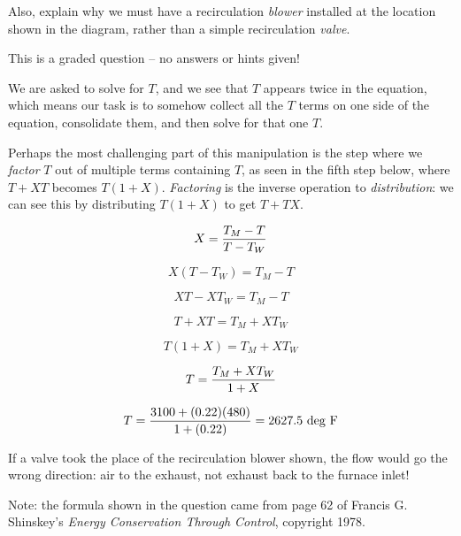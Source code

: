 \vskip 10pt

Also, explain why we must have a recirculation {\it blower} installed at the location shown in the diagram, rather than a simple recirculation {\it valve}.

\vfil 

\eject






This is a graded question -- no answers or hints given!







We are asked to solve for $T$, and we see that $T$ appears twice in the equation, which means our task is to somehow collect all the $T$ terms on one side of the equation, consolidate them, and then solve for that one $T$.  

Perhaps the most challenging part of this manipulation is the step where we {\it factor} $T$ out of multiple terms containing $T$, as seen in the fifth step below, where $T + XT$ becomes $T(1 + X)$.  {\it Factoring} is the inverse operation to {\it distribution}: we can see this by distributing $T(1 + X)$ to get $T + TX$.

$$X = {{T_M - T} \over {T - T_W}}$$

$$X (T - T_W) = T_M - T$$

$$XT - XT_W = T_M - T$$

$$T + XT = T_M + XT_W$$

$$T (1 + X) = T_M + XT_W$$

$$T = {{T_M + XT_W} \over {1 + X}}$$

\vskip 10pt

$$T = {{3100 + (0.22)(480)} \over {1 + (0.22)}} = 2627.5 \hbox{ deg F}$$

\vskip 10pt

If a valve took the place of the recirculation blower shown, the flow would go the wrong direction: air to the exhaust, not exhaust back to the furnace inlet!

\vskip 30pt

Note: the formula shown in the question came from page 62 of Francis G. Shinskey's {\it Energy Conservation Through Control}, copyright 1978.




